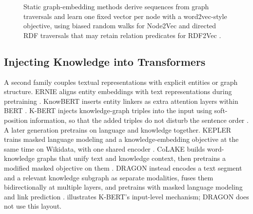 \begin{figure}[t]
{}
\caption{Static graph-embedding methods derive sequences from graph traversals and learn one
fixed vector per node with a word2vec-style objective, using biased random walks for Node2Vec
and directed RDF traversals that may retain relation predicates for RDF2Vec
\citep{grover2016node2vec,ristoski2016rdf2vec}.}
\label{fig:corpus-static}
\end{figure}

\subsection{Injecting Knowledge into Transformers}

A second family couples textual representations with explicit entities or graph structure. ERNIE
aligns entity embeddings with text representations during pretraining \citep{zhang2019ernie}.
KnowBERT inserts entity linkers as extra attention layers within BERT
\citep{peters2019knowbert}. K-BERT injects knowledge-graph
triples into the input using soft-position information, so that the added triples do not
disturb the sentence order \citep{liu2020kbert}. A later generation pretrains on language and
knowledge together. KEPLER trains masked language modeling and a knowledge-embedding objective
at the same time on Wikidata, with one shared encoder \citep{wang2021kepler}. CoLAKE builds
word-knowledge graphs that unify text and knowledge context, then pretrains a modified masked
objective on them \citep{sun2020colake}. DRAGON instead encodes a text segment and a relevant
knowledge subgraph as separate modalities, fuses them bidirectionally at multiple layers, and
pretrains with masked language modeling and link prediction \citep{yasunaga2022dragon}.
 illustrates K-BERT's input-level mechanism; DRAGON does not use this
layout.

